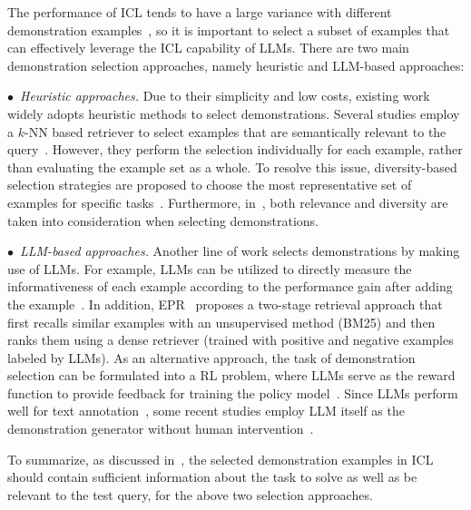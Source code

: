 {
The performance of ICL tends to have a large variance with different demonstration examples~\cite{Liu-ACL-2022-What}, so it is important to select a subset of examples that can effectively leverage the ICL capability of LLMs.}
There are two main demonstration selection approaches, namely heuristic and LLM-based approaches:


$\bullet$~\emph{Heuristic approaches.}  
{Due to their simplicity and low costs,} existing work widely adopts heuristic methods to select demonstrations.
Several studies employ a $k$-NN based retriever to select examples that are semantically relevant to the query~\cite{Liu-ACL-2022-What, Lee-COLING-2022-Does}.
{However, they perform the selection individually for each example, rather than evaluating the example set as a whole.}
To resolve this issue, diversity-based selection strategies are proposed to choose the most representative set of examples for specific tasks~\cite{Levy-arxiv-2022-Diverse, Su-arxiv-2022-selective}.
Furthermore, in~\cite{Ye-arxiv-2022-Complementary}, both relevance and diversity are taken into consideration when selecting demonstrations.


$\bullet$~\emph{LLM-based approaches.}  
Another line of work selects demonstrations by making use of LLMs. 
For example, LLMs can be utilized to directly measure the informativeness of each example according to the performance gain after adding the example~\cite{Li-arxiv-2023-Finding}. 
In addition, EPR~\cite{Rubin-NAACL-2022-Learning} proposes a two-stage retrieval approach that first recalls similar examples with an unsupervised method (\eg BM25) and then ranks them using a dense retriever (trained with positive and negative examples labeled by LLMs).
As an alternative approach, the task of demonstration selection can be formulated into a RL problem, where LLMs serve as the reward function to provide feedback for training the policy model~\cite{Zhang-EMNLP-2022-Active}. Since LLMs perform well for text annotation~\cite{Gilardi-arXiv-2023-Crowd}, some recent studies employ LLM itself as the demonstration generator without human intervention~\cite{Kim-arxiv-2022-Self-Generated}. 

{To summarize, as discussed in~\cite{Michael-ICLR-2022-An}, the selected demonstration examples in ICL should contain sufficient information about the task to solve as well as be relevant to the test query, for the above two selection approaches.} 

